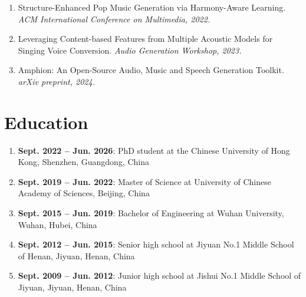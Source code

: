 \documentclass{resume}
\begin{document}
\begin{enumerate}\itemsep 0.5em
  \item Structure-Enhanced Pop Music Generation via Harmony-Aware Learning. \textit{ACM International Conference on Multimedia, 2022.}
  \item Leveraging Content-based Features from Multiple Acoustic Models for Singing Voice Conversion. \textit{Audio Generation Workshop, 2023.}
  \item Amphion: An Open-Source Audio, Music and Speech Generation Toolkit. \textit{arXiv preprint, 2024.}
\end{enumerate}


\section{Education}

\begin{enumerate}
  \item \textbf{Sept. 2022 -- Jun. 2026}: PhD student at the Chinese University of Hong Kong, Shenzhen, Guangdong, China
  \item \textbf{Sept. 2019 -- Jun. 2022}: Master of Science at University of Chinese Academy of Sciences, Beijing, China
  \item \textbf{Sept. 2015 -- Jun. 2019}: Bachelor of Engineering at Wuhan University, Wuhan, Hubei, China
  \item \textbf{Sept. 2012 -- Jun. 2015}: Senior high school at Jiyuan No.1 Middle School of Henan, Jiyuan, Henan, China
  \item \textbf{Sept. 2009 -- Jun. 2012}: Junior high school at Jishui No.1 Middle School of Jiyuan, Jiyuan, Henan, China
\end{enumerate}



\end{document}

